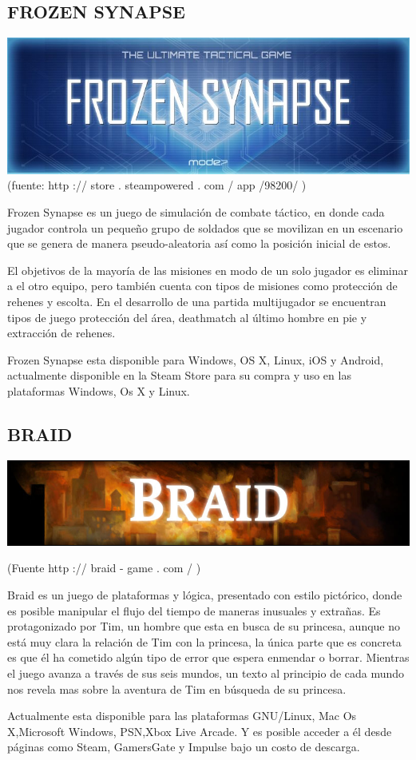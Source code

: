 \subsection*{FROZEN SYNAPSE}
\includegraphics[scale=0.5]{img/cp07/img0704.png}
(fuente: http :// store . steampowered . com / app /98200/ )

Frozen Synapse es un juego de simulación de combate táctico,
en donde cada jugador controla un pequeño grupo de soldados
que se movilizan en un escenario que se genera de manera
pseudo-aleatoria así como la posición inicial de estos.

El objetivos de la mayoría de las misiones en modo de un solo
jugador es eliminar a el otro equipo, pero también cuenta con
tipos de misiones como protección de rehenes y escolta. En el
desarrollo de una partida multijugador se encuentran tipos de
juego protección del área, deathmatch al último hombre en pie y
extracción de rehenes.

Frozen Synapse esta disponible para Windows, OS X, Linux, iOS
y Android, actualmente disponible en la Steam Store para su
compra y uso en las plataformas Windows, Os X y Linux.


\subsection*{BRAID}
\includegraphics[scale=0.5]{img/cp07/img0705.png}

(Fuente http :// braid - game . com / )

Braid es un juego de plataformas y lógica, presentado con estilo
pictórico, donde es posible manipular el flujo del tiempo de
maneras inusuales y extrañas. Es protagonizado por Tim, un
hombre que esta en busca de su princesa, aunque no está muy
clara la relación de Tim con la princesa, la única parte que es
concreta es que él ha cometido algún tipo de error que espera
enmendar o borrar. Mientras el juego avanza a través de sus seis
mundos, un texto al principio de cada mundo nos revela mas
sobre la aventura de Tim en búsqueda de su princesa.

Actualmente esta disponible para las plataformas GNU/Linux,
Mac Os X,Microsoft Windows, PSN,Xbox Live Arcade. Y es
posible acceder a él desde páginas como Steam, GamersGate y
Impulse bajo un costo de descarga.


